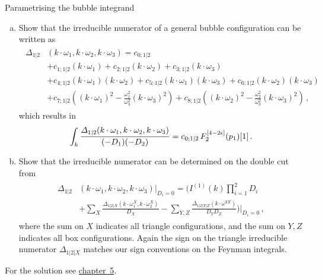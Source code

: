 \begin{exer}{Parametrising the bubble integrand}
\label{Ex:3.6}
\vspace{-0.6cm}
\begin{enumerate}[a)]
\item Show that the irreducible numerator of a general bubble configuration can be written as
\begin{align} \label{eq:bubble_num_param}
\begin{aligned}
  \Delta_{1|2}&(k\cdot\omega_1, k\cdot\omega_2, k\cdot\omega_3) = c_{0;1|2} \\
 & + c_{1;1|2} (k\cdot\omega_1) 
  + c_{2;1|2} (k\cdot\omega_2) 
  + c_{3;1|2} (k\cdot\omega_3) \\ 
&  + c_{4;1|2} (k\cdot\omega_1) (k\cdot\omega_2) 
  + c_{5;1|2} (k\cdot\omega_1) (k\cdot\omega_3) 
  + c_{6;1|2} (k\cdot\omega_2) (k\cdot\omega_3) \\  
 & + c_{7;1|2} \left((k\cdot\omega_1)^2 - \frac{\omega_1^2}{\omega_3^2} (k\cdot\omega_3)^2 \right)
  + c_{8;1|2} \left((k\cdot\omega_2)^2 - \frac{\omega_2^2}{\omega_3^2} (k\cdot\omega_3)^2 \right) \,,
\end{aligned}
\end{align}
which results in
\begin{align}
  \int_k \frac{\Delta_{1|2}(k\cdot\omega_1, k\cdot\omega_2, k\cdot\omega_3)}{(-D_1) (-D_2)}  = c_{0;1|2} \, F^{[4-2\eps]}_2(p_1)[1] \,.
\end{align}
\item Show that the irreducible numerator can be determined on the double cut from
\begin{align}
\begin{aligned}
  \Delta_{1|2}&(k\cdot\omega_1, k\cdot\omega_2, k\cdot\omega_3) \bigg|_{D_i = 0} =
     \bigg( I^{(1)}(k) \prod_{i=1}^2 D_i \\&
     + \sum_X \frac{\Delta_{1|2|X}(k\cdot\omega_1^{X}, k\cdot\omega_2^{X})}{D_X} - \sum_{Y,Z} \frac{\Delta_{1|2|Y|Z}(k\cdot\omega^{YZ})}{D_Y D_Z} \bigg) \bigg|_{D_i = 0} \,,
\end{aligned}
  \label{eq:doublecuteq}
\end{align}
where the sum on $X$ indicates all triangle configurations, and the sum on $Y,Z$ indicates all box configurations. Again the sign on the triangle irreducible numerator $\Delta_{1|2|X}$ matches our sign conventions on the Feynman integrals.
\end{enumerate}
For the solution see \hyperref[Sol:3.6]{chapter~5}.
\end{exer}

